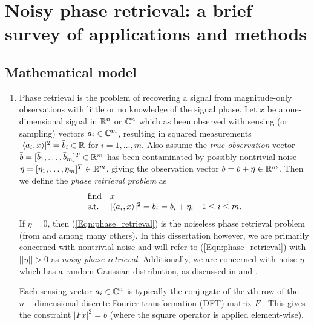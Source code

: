 \chapter{Noisy phase retrieval: a brief survey of applications and methods} 	\label{Sec:phase_retrieval}


\section{Mathematical model}	\label{Subsec:phase_retrieval-math_model}

\begin{enumerate}

\item

Phase retrieval is the problem of recovering a signal from magnitude-only observations with little or no knowledge of the signal phase.  Let $\bar{x}$ be a one-dimensional signal in ${\mathbb R}^n$ or ${\mathbb C}^n$ which as been observed with sensing (or sampling) vectors $a_i \in {\mathbb C}^m$, resulting in squared measurements $|\langle a_i, \bar{x} \rangle |^2 = \bar{b}_i \in {\mathbb R}$ for $i = 1, \ldots, m$.  Also assume the \textit{true observation} vector $\bar{b} = [\bar{b}_1, \ldots, \bar{b}_m]^T \in {\mathbb R}^m$ has been contaminated by possibly nontrivial noise $\eta = [\eta_1, \ldots, \eta_m]^T \in {\mathbb R}^m$, giving the observation vector $b = \bar{b} + \eta \in {\mathbb R}^m$.  Then we define the \textit{phase retrieval problem} as
\begin{equation} \label{Eqn:phase_retrieval}
\begin{array}{lll}
\textnormal{find}		&	x		\\
\textnormal{s.t.}				&	|\langle a_i, x \rangle|^2 = b_i = \bar{b}_i + \eta_i	&	1 \leq i \leq m.
\end{array}
\end{equation}
If $\eta = 0$, then (\ref{Eqn:phase_retrieval}) is the noiseless phase retrieval problem (from \cite{Fienup82} and  \cite{DBLP:journals/tit/CandesLS15} among many others).  In this dissertation however, we are primarily concerned with nontrivial noise and will refer to (\ref{Eqn:phase_retrieval}) with $||\eta|| > 0$ as \textit{noisy phase retrieval}.  Additionally, we are concerned with noise $\eta$ which has a random Gaussian distribution, as discussed in \cite{DBLP:journals/siamis/CandesESV13} and \cite{DBLP:journals/siamsc/FriedlanderM16}.


Each sensing vector $a_i \in {\mathbb C}^n$ is typically the conjugate of the $i$th row of the $n-$dimensional discrete Fourier transformation (DFT) matrix $F$ \cite[Chapter 11]{bracewell1986fourier}.  This gives the constraint $|Fx|^2 = b$ (where the square operator is applied element-wise).  



\end{enumerate}
